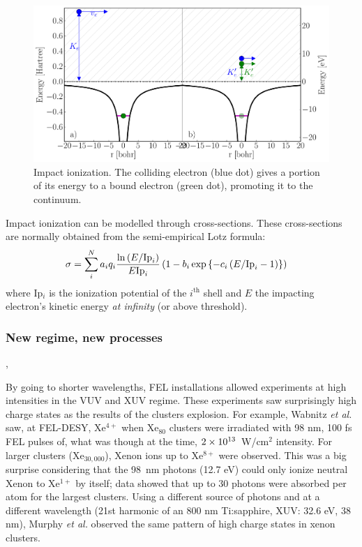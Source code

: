 \begin{figure}
 \centering
 \includegraphics[width=\figurewidth]{figures/ionization_impact}
 \caption{Impact ionization. The colliding electron (blue dot) gives a portion
          of its energy to a bound electron (green dot), promoting it to the
          continuum.}
 \label{fig:ionization:impact}
\end{figure}

Impact ionization can be modelled through cross-sections. These
cross-sections are normally obtained from the semi-empirical Lotz
formula\cite{Lotz1967}:
\begin{align}
\sigma & = \sum_{i}^{N} a_i q_i \frac{\ln{\left( E/\textrm{Ip}_i \right)}}{E \textrm{Ip}_i} \left( 1 - b_i
\exp{ \left\{ -c_i \left( E/\textrm{Ip}_i - 1 \right) \right\}} \right)
\label{eqn:impact:ionization:lotz}
\end{align}
where Ip$_i$ is the ionization potential of the $i^{\textrm{th}}$ shell and $E$
the impacting electron's kinetic energy \textit{at infinity} (or above threshold).

\subsubsection{New regime, new processes}
\label{section:intro:mechanisms:new},

By going to shorter wavelengths, FEL installations allowed experiments at high
intensities in the VUV and XUV regime. These experiments saw surprisingly
high charge states as the results of the clusters
explosion\cite{Wabnitz2002,Bostedt2010}. For example, Wabnitz \textit{et al.}
saw, at FEL-DESY, Xe$^{4+}$ when Xe$_{80}$ clusters were irradiated with 98 nm,
100 fs FEL pulses of, what was though at the time, $\ten{2}{13}$~W/cm$^2$
intensity. For larger clusters (Xe$_{30,000}$), Xenon ions up to
Xe$^{8+}$ were observed. This was a big surprise considering that the 98~nm
photons (12.7 eV) could only ionize neutral Xenon to Xe$^{1+}$ by itself;
data showed that up to 30 photons were absorbed per atom for the largest
clusters. Using a different source of photons and at a different wavelength
(21st harmonic of an 800 nm Ti:sapphire, XUV: 32.6 eV, 38 nm),
Murphy \textit{et al.} observed the same pattern of high charge states in xenon
clusters\cite{Murphy2008a,Murphy2008b}.


